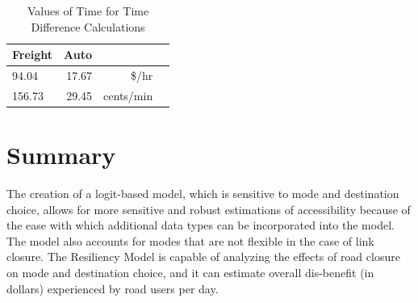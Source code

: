 \begin{table}


\caption{\label{tab:VOT}Values of Time for Time Difference Calculations}
\centering
\begin{tabular}[t]{lrrr}
\toprule
Freight & Auto \\
\midrule
94.04 & 17.67 & \$/hr\\
156.73 & 29.45 & cents/min\\
\bottomrule
\end{tabular}
\end{table}

\section{Summary}

The creation of a logit-based model, which is sensitive to mode and destination
choice, allows for more sensitive and robust estimations of accessibility because
of the ease with which additional data types can be incorporated into the model. The
model also accounts for modes that are not flexible in the case of link
closure. The Resiliency Model is capable of analyzing the effects of
road closure on mode and destination choice, and it can estimate overall
dis-benefit (in dollars) experienced by road users per day.
